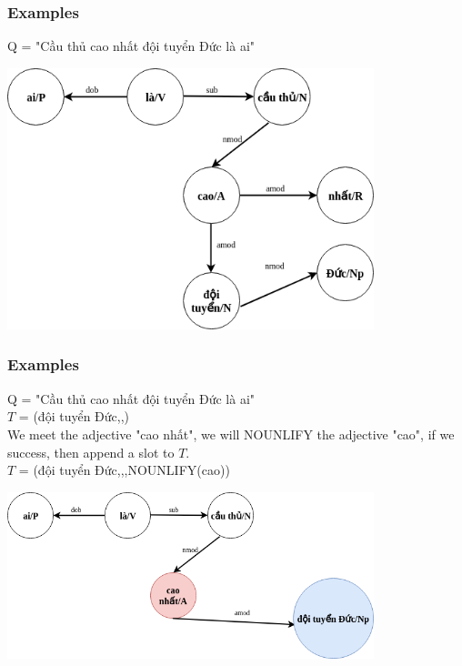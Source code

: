 \documentclass{beamer}
\begin{document}
\begin{frame}
	\frametitle{Examples}
	
	Q = "Cầu thủ cao nhất đội tuyển Đức là ai"
	
	\begin{center} 
		\centering 
			\includegraphics[width=0.8\textwidth,height=0.8\textheight,keepaspectratio]{thirdextree}
			\vspace{0.5cm} 
	\end{center}
		
\end{frame}

\begin{frame}
	\frametitle{Examples}
	
	Q = "Cầu thủ cao nhất đội tuyển Đức là ai"\\
	$T$ = (đội tuyển Đức,,)\\
	
	We meet the adjective "cao nhất", we will NOUNLIFY the adjective "cao", if we success, then append a slot to $T$.\\
	$T$ = (đội tuyển Đức,,,NOUNLIFY(cao))\\
	
	
	\begin{center} 
		\centering 
			\includegraphics[width=0.8\textwidth,height=0.8\textheight,keepaspectratio]{thirdextree2}
			\vspace{0.5cm} 
	\end{center}
		
\end{frame}
\end{document}
